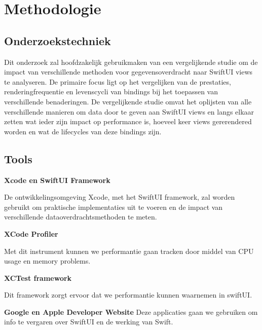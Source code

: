 


\section{Methodologie}%
\label{sec:methodologie}

\subsection{Onderzoekstechniek}
Dit onderzoek zal hoofdzakelijk gebruikmaken van een vergelijkende studie om de impact van verschillende methoden voor gegevensoverdracht naar SwiftUI views te analyseren. De primaire focus ligt op het vergelijken van de prestaties, renderingfrequentie en levenscycli van bindings bij het toepassen van verschillende benaderingen. De vergelijkende studie omvat het oplijsten van alle verschillende manieren om data door te geven aan SwiftUI views en langs elkaar zetten wat ieder zijn impact op performance is, hoeveel keer views gererendered  worden en wat de lifecycles van deze bindings zijn. 

\subsection{Tools}
\textbf{Xcode en SwiftUI Framework}

De ontwikkelingsomgeving Xcode, met het SwiftUI framework, zal worden gebruikt om praktische implementaties uit te voeren en de impact van verschillende dataoverdrachtsmethoden te meten.

\textbf{XCode Profiler}

Met dit instrument kunnen we performantie gaan tracken door middel van CPU usage en memory problems.

\textbf{XCTest framework}

Dit framework zorgt ervoor dat we performantie kunnen waarnemen in swiftUI.

\textbf{Google en Apple Developer Website}
Deze applicaties gaan we gebruiken om info te vergaren over SwiftUI en de werking van Swift.


